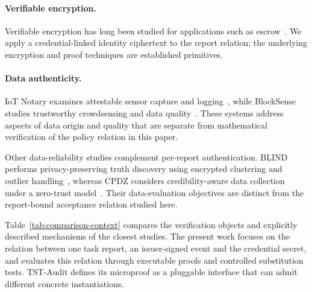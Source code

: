\documentclass[pdflatex,iicol,sn-mathphys-num]{sn-jnl}
\begin{document}
\paragraph{Verifiable encryption.} Verifiable encryption has long been studied for applications such as escrow~\citep{CamenischShoup2003}. We apply a credential-linked identity ciphertext to the report relation; the underlying encryption and proof techniques are established primitives.

\paragraph{Data authenticity.} IoT Notary examines attestable sensor capture and logging~\citep{Panwar2022IoTNotary}, while BlockSense studies trustworthy crowdsensing and data quality~\citep{Huang2024BlockSense}. These systems address aspects of data origin and quality that are separate from mathematical verification of the policy relation in this paper.

Other data-reliability studies complement per-report authentication. BLIND performs privacy-preserving truth discovery using encrypted clustering and outlier handling~\citep{Agate2024BLIND}, whereas CPDZ considers credibility-aware data collection under a zero-trust model~\citep{Tang2025CPDZ}. Their data-evaluation objectives are distinct from the report-bound acceptance relation studied here.

Table~\ref{tab:comparison-context} compares the verification objects and explicitly described mechanisms of the closest studies. The present work focuses on the relation between one task report, an issuer-signed event and the credential secret, and evaluates this relation through executable proofs and controlled substitution tests. TST-Audit defines its microproof as a pluggable interface that can admit different concrete instantiations.
\end{document}
